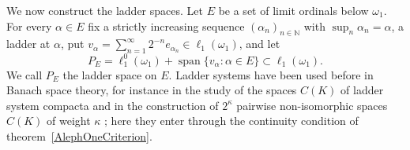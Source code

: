 \documentclass[12pt]{article}
\newcommand{\lo}[1]{\ell_1^0(#1)}
\newcommand{\ellone}[1]{\ell_1(#1)}
\newcommand{\Lin}{\operatorname{span}}
\begin{document}
We now construct the ladder spaces.
Let $E$ be a set of limit ordinals below $\omega_1$. For every $\alpha\in E$
fix a strictly increasing sequence ${(\alpha_n)}_{n\in\mathbb{N}}$ with
$\sup_n\alpha_n=\alpha$, a ladder at $\alpha$, put
$v_\alpha=\sum_{n=1}^\infty 2^{-n}e_{\alpha_n}\in\ellone{\omega_1}$, and let
\[
P_E=\lo{\omega_1}+\Lin\{v_\alpha:\alpha\in E\}\subset\ellone{\omega_1}.
\]
We call $P_E$ the ladder space on $E$. Ladder systems have been used before
in Banach space theory, for instance in the study of the spaces $C(K)$ of
ladder system compacta \cite{FerrerKoszmiderKubisLadder} and in the
construction of $2^\kappa$ pairwise non-isomorphic spaces $C(K)$ of weight
$\kappa$ \cite{KorpalskiKoszmiderMarciszewskiCounting}; here they enter
through the continuity condition of theorem~\ref{AlephOneCriterion}.
\end{document}
